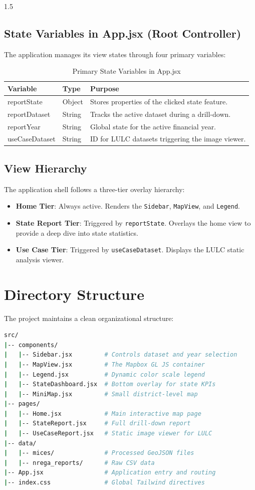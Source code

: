 \documentclass[12pt,a4paper]{report}
\begin{document}
\begin{spacing}{1.5}
\subsection{State Variables in App.jsx (Root Controller)}
The application manages its view states through four primary variables:
\begin{table}[H]
\centering
\begin{tabular}{@{}lll@{}}
\toprule
\textbf{Variable} & \textbf{Type} & \textbf{Purpose} \\ \midrule
reportState & Object & Stores properties of the clicked state feature. \\
reportDataset & String & Tracks the active dataset during a drill-down. \\
reportYear & String & Global state for the active financial year. \\
useCaseDataset & String & ID for LULC datasets triggering the image viewer. \\ \bottomrule
\end{tabular}
\caption{Primary State Variables in App.jsx}
\end{table}

\subsection{View Hierarchy}
The application shell follows a three-tier overlay hierarchy:
\begin{itemize}
    \item \textbf{Home Tier}: Always active. Renders the \texttt{Sidebar}, \texttt{MapView}, and \texttt{Legend}.
    \item \textbf{State Report Tier}: Triggered by \texttt{reportState}. Overlays the home view to provide a deep dive into state statistics.
    \item \textbf{Use Case Tier}: Triggered by \texttt{useCaseDataset}. Displays the LULC static analysis viewer.
\end{itemize}

\section{Directory Structure}
The project maintains a clean organizational structure:
\begin{lstlisting}[language=bash, caption={Project Directory Structure}]
src/
|-- components/
|   |-- Sidebar.jsx         # Controls dataset and year selection
|   |-- MapView.jsx         # The Mapbox GL JS container
|   |-- Legend.jsx          # Dynamic color scale legend
|   |-- StateDashboard.jsx  # Bottom overlay for state KPIs
|   |-- MiniMap.jsx         # Small district-level map
|-- pages/
|   |-- Home.jsx            # Main interactive map page
|   |-- StateReport.jsx     # Full drill-down report
|   |-- UseCaseReport.jsx   # Static image viewer for LULC
|-- data/
|   |-- mices/              # Processed GeoJSON files
|   |-- nrega_reports/      # Raw CSV data
|-- App.jsx                 # Application entry and routing
|-- index.css               # Global Tailwind directives
\end{lstlisting}


\end{spacing}
\end{document}
